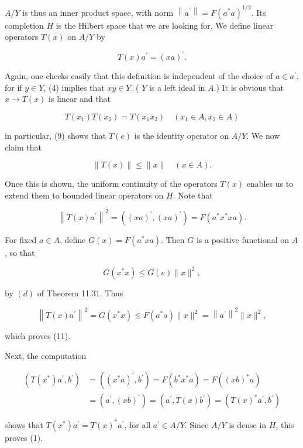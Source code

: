 \documentclass[10pt]{article}
\begin{document}
$A / Y$ is thus an inner product space, with norm $\left\|a^{\prime}\right\|=F\left(a^{*} a\right)^{1 / 2}$. Its completion $H$ is the Hilbert space that we are looking for. We define linear operators $T(x)$ on $A / Y$ by

$$
T(x) a^{\prime}=(x a)^{\prime} .
$$

Again, one checks easily that this definition is independent of the choice of $a \in a^{\prime}$, for if $y \in Y$, (4) implies that $x y \in Y$. ( $Y$ is a left ideal in $A$.) It is obvious that $x \rightarrow T(x)$ is linear and that

$$
T\left(x_{1}\right) T\left(x_{2}\right)=T\left(x_{1} x_{2}\right) \quad\left(x_{1} \in A, x_{2} \in A\right)
$$

in particular, (9) shows that $T(e)$ is the identity operator on $A / Y$. We now claim that

$$
\|T(x)\| \leq\|x\| \quad(x \in A) .
$$

Once this is shown, the uniform continuity of the operators $T(x)$ enables us to extend them to bounded linear operators on $H$. Note that

$$
\left\|T(x) a^{\prime}\right\|^{2}=\left((x a)^{\prime},(x a)^{\prime}\right)=F\left(a^{*} x^{*} x a\right) .
$$

For fixed $a \in A$, define $G(x)=F\left(a^{*} x a\right)$. Then $G$ is a positive functional on $A$, so that

$$
G\left(x^{*} x\right) \leq G(e)\|x\|^{2},
$$

by $(d)$ of Theorem 11.31. Thus

$$
\left\|T(x) a^{\prime}\right\|^{2}=G\left(x^{*} x\right) \leq F\left(a^{*} a\right)\|x\|^{2}=\left\|a^{\prime}\right\|^{2}\|x\|^{2},
$$

which proves (11).

Next, the computation

$$
\begin{aligned}
\left(T\left(x^{*}\right) a^{\prime}, b^{\prime}\right) & =\left(\left(x^{*} a\right)^{\prime}, b^{\prime}\right)=F\left(b^{*} x^{*} a\right)=F\left((x b)^{*} a\right) \\
& =\left(a^{\prime},(x b)^{\prime}\right)=\left(a^{\prime}, T(x) b^{\prime}\right)=\left(T(x)^{*} a^{\prime}, b^{\prime}\right)
\end{aligned}
$$

shows that $T\left(x^{*}\right) a^{\prime}=T(x)^{*} a^{\prime}$, for all $a^{\prime} \in A / Y$. Since $A / Y$ is dense in $H$, this proves (1).
\end{document}
